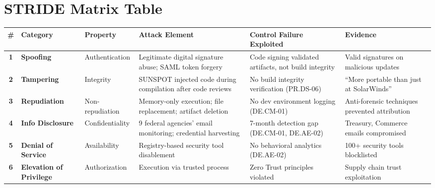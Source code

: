 \clearpage
\section{STRIDE Matrix Table}
\label{app:stride}

\begin{table}[h] %
    \centering
    \small
    \renewcommand{\arraystretch}{1.3}
    \begin{tabularx}{\textwidth}{>{\bfseries}c >{\bfseries}l l X X X}
        \toprule
        \# & Category & Property & Attack Element & Control Failure Exploited & Evidence \\
        \midrule
        1 & Spoofing & Authentication & Legitimate digital signature abuse; SAML token forgery & Code signing validated artifacts, not build integrity & Valid signatures on malicious updates \cite{mandiant_highly_2020} \\
        
        2 & Tampering & Integrity & SUNSPOT injected code during compilation after code reviews & No build integrity verification (PR.DS-06) & ``More portable than just at SolarWinds'' \cite{us_open_2021} \\
        
        3 & Repudiation & Non-repudiation & Memory-only execution; file replacement; artifact deletion & No dev environment logging (DE.CM-01) & Anti-forensic techniques prevented attribution \cite{mandiant_highly_2020} \\
        
        4 & Info Disclosure & Confidentiality & 9 federal agencies' email monitoring; credential harvesting & 7-month detection gap (DE.CM-01, DE.AE-02) & Treasury, Commerce emails compromised \cite{nagle_solarwinds_2023} \\
        
        5 & Denial of Service & Availability & Registry-based security tool disablement & No behavioral analytics (DE.AE-02) & 100+ security tools blocklisted \cite{eckels_sunburst_2020} \\
        
        6 & Elevation of Privilege & Authorization & Execution via trusted process & Zero Trust principles violated \cite{rose_zero_2020} & Supply chain trust exploitation \cite{mandiant_highly_2020} \\
        \bottomrule
    \end{tabularx}
\end{table}
